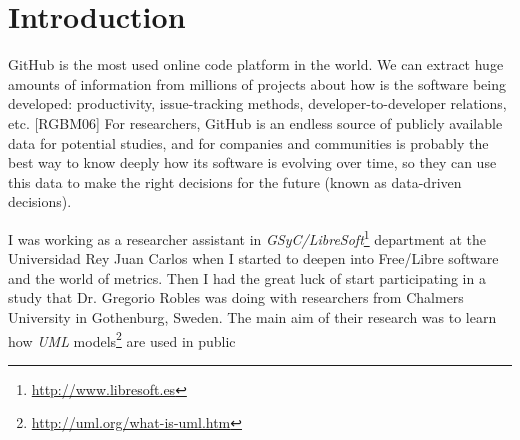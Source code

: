 \documentclass[a4paper, 12pt]{book}
\begin{document}
\tableofcontents
\cleardoublepage
\listoffigures %


\cleardoublepage
\chapter{Introduction}
\label{sec:intro} %
GitHub is the most used online code platform in the world. We can extract huge amounts of information from millions of projects
about how is the software being developed: productivity, issue-tracking methods, developer-to-developer relations, etc. [RGBM06]
For researchers, GitHub is an endless source of publicly available data for potential studies, and for companies and communities
is probably the best way to know deeply how its software is evolving over time, so they can use this data to make the right decisions
for the future (known as data-driven decisions).\par
I was working as a researcher assistant in \emph{GSyC/LibreSoft}\footnote{\url{http://www.libresoft.es}} department at the Universidad 
Rey Juan Carlos when I started to deepen into Free/Libre software and the world of metrics.
Then I had the great luck of start participating in a study that
Dr. Gregorio Robles was doing with researchers from Chalmers University in Gothenburg, Sweden. The main aim of their research was to
learn how \emph{UML} models\footnote{\url{http://uml.org/what-is-uml.htm}} are used in public
\end{document}

